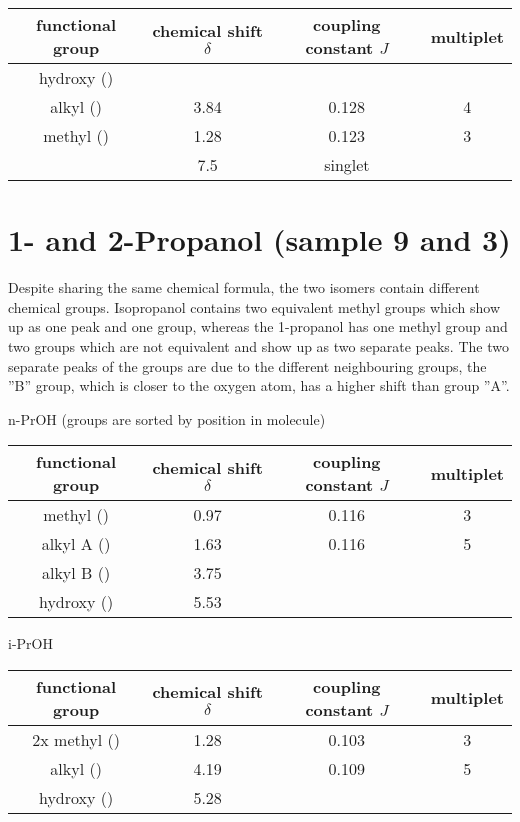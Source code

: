 \begin{center}
	\begin{tabular}{cSSc}
		\toprule
		functional group&	{chemical shift $\delta$}&	{coupling constant $J$}& multiplet\\
		\midrule
		hydroxy ()&\\
		alkyl ()&	3.84&	0.128&	4\\
		methyl ()&	1.28&	0.123&	3\\
		&	7.5& {singlet}\\
		\bottomrule
	\end{tabular}
\end{center}

\section{1- and 2-Propanol (sample 9 and 3)}

Despite sharing the same chemical formula, the two isomers contain different chemical groups.
Isopropanol contains two equivalent methyl groups which show up as one peak and one  group, whereas the 1-propanol has one methyl group and two  groups which are not equivalent and show up as two separate peaks.
The two separate peaks of the  groups are due to the different neighbouring groups, the ''B'' group, which is closer to the oxygen atom, has a higher shift than group ''A''.

\begin{center}
	n-PrOH (groups are sorted by position in molecule)\\
	\begin{tabular}{cSSc}
		\toprule
		functional group&	{chemical shift $\delta$}&	{coupling constant $J$}& multiplet\\
		\midrule
		methyl ()&	0.97&	0.116&	3\\
		alkyl A ()&	1.63&	0.116&	5\\
		alkyl B ()&	3.75&	\\
		hydroxy ()&	5.53&	\\
		\bottomrule
	\end{tabular}

	i-PrOH\\
	\begin{tabular}{cSSc}
		\toprule
		functional group&	{chemical shift $\delta$}&	{coupling constant $J$}& multiplet\\
		\midrule
		2x methyl ()&	1.28&	0.103& 3\\
		alkyl ()&	4.19&	0.109&	5\\
		hydroxy ()&	5.28&	\\
		\bottomrule
	\end{tabular}
\end{center}

